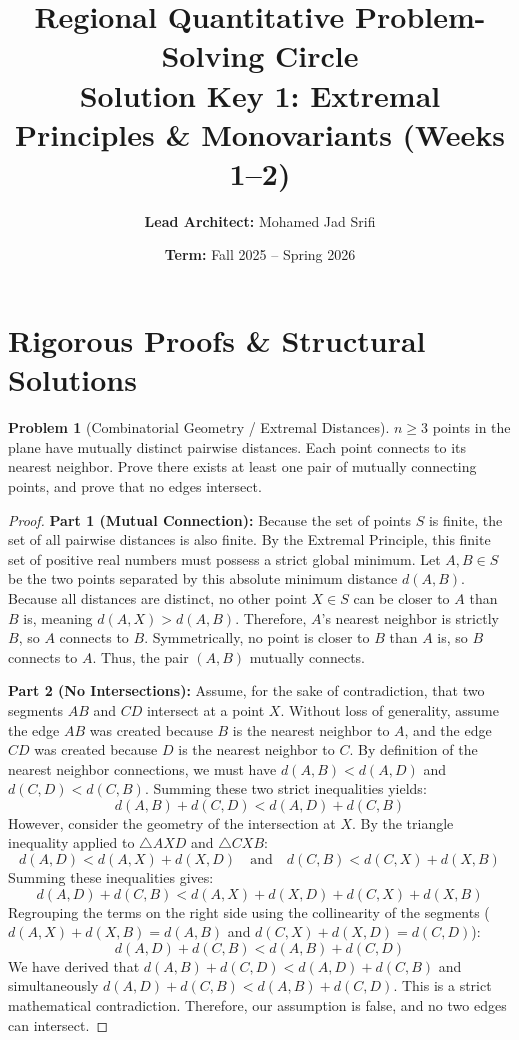 \documentclass[11pt, a4paper]{article}
\theoremstyle{definition}
\newtheorem{problem}{Problem}
\theoremstyle{plain}
\begin{document}
\title{\vspace{-1.5cm}\textbf{Regional Quantitative Problem-Solving Circle} \\ \Large Solution Key 1: Extremal Principles \& Monovariants (Weeks 1--2)}
\author{\textbf{Lead Architect:} Mohamed Jad Srifi}
\date{\textbf{Term:} Fall 2025 -- Spring 2026}
\maketitle

\section*{Rigorous Proofs \& Structural Solutions}

\begin{problem}[Combinatorial Geometry / Extremal Distances]
$n \ge 3$ points in the plane have mutually distinct pairwise distances. Each point connects to its nearest neighbor. Prove there exists at least one pair of mutually connecting points, and prove that no edges intersect.
\end{problem}

\begin{proof}
\textbf{Part 1 (Mutual Connection):} 
Because the set of points $S$ is finite, the set of all pairwise distances is also finite. By the Extremal Principle, this finite set of positive real numbers must possess a strict global minimum. Let $A, B \in S$ be the two points separated by this absolute minimum distance $d(A, B)$. 
Because all distances are distinct, no other point $X \in S$ can be closer to $A$ than $B$ is, meaning $d(A, X) > d(A, B)$. Therefore, $A$'s nearest neighbor is strictly $B$, so $A$ connects to $B$. Symmetrically, no point is closer to $B$ than $A$ is, so $B$ connects to $A$. Thus, the pair $(A, B)$ mutually connects.

\textbf{Part 2 (No Intersections):}
Assume, for the sake of contradiction, that two segments $AB$ and $CD$ intersect at a point $X$. Without loss of generality, assume the edge $AB$ was created because $B$ is the nearest neighbor to $A$, and the edge $CD$ was created because $D$ is the nearest neighbor to $C$. 
By definition of the nearest neighbor connections, we must have $d(A, B) < d(A, D)$ and $d(C, D) < d(C, B)$.
Summing these two strict inequalities yields:
\[
d(A, B) + d(C, D) < d(A, D) + d(C, B)
\]
However, consider the geometry of the intersection at $X$. By the triangle inequality applied to $\triangle AXD$ and $\triangle CXB$:
\[
d(A, D) < d(A, X) + d(X, D) \quad \text{and} \quad d(C, B) < d(C, X) + d(X, B)
\]
Summing these inequalities gives:
\[
d(A, D) + d(C, B) < d(A, X) + d(X, D) + d(C, X) + d(X, B)
\]
Regrouping the terms on the right side using the collinearity of the segments ($d(A, X) + d(X, B) = d(A, B)$ and $d(C, X) + d(X, D) = d(C, D)$):
\[
d(A, D) + d(C, B) < d(A, B) + d(C, D)
\]
We have derived that $d(A, B) + d(C, D) < d(A, D) + d(C, B)$ and simultaneously $d(A, D) + d(C, B) < d(A, B) + d(C, D)$. This is a strict mathematical contradiction. Therefore, our assumption is false, and no two edges can intersect.
\end{proof}
\end{document}
